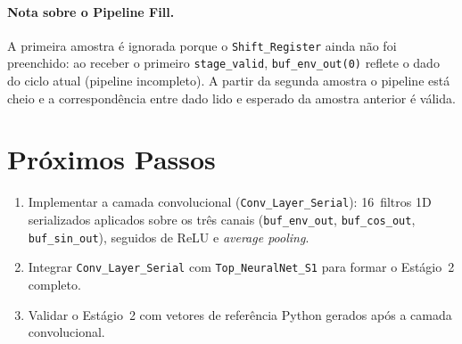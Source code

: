\documentclass[a4paper,12pt]{article}
\begin{document}
\paragraph{Nota sobre o Pipeline Fill.}
A primeira amostra \'e ignorada porque o \texttt{Shift\_Register} ainda n\~ao foi preenchido:
ao receber o primeiro \texttt{stage\_valid}, \texttt{buf\_env\_out(0)} reflete o dado do ciclo
atual (pipeline incompleto). A partir da segunda amostra o pipeline est\'a cheio e a
correspond\^encia entre dado lido e esperado da amostra anterior \'e v\'alida.


\section{Pr\'oximos Passos}

\begin{enumerate}
    \item Implementar a camada convolucional (\texttt{Conv\_Layer\_Serial}): 16~filtros 1D
          serializados aplicados sobre os tr\^es canais (\texttt{buf\_env\_out},
          \texttt{buf\_cos\_out}, \texttt{buf\_sin\_out}), seguidos de ReLU e
          \textit{average pooling}.
    \item Integrar \texttt{Conv\_Layer\_Serial} com \texttt{Top\_NeuralNet\_S1} para formar
          o Est\'agio~2 completo.
    \item Validar o Est\'agio~2 com vetores de refer\^encia Python gerados ap\'os a camada
          convolucional.
\end{enumerate}
\end{document}
